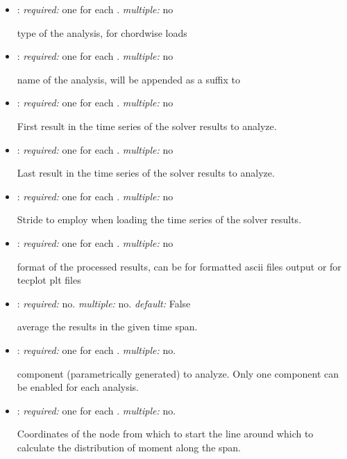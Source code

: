 \begin{itemize}
\item {}: \textit{required:} one for each . \textit{multiple:} no

type of the analysis,  for chordwise loads

\item {}: \textit{required:} one for each . \textit{multiple:} no

name of the analysis, will be appended as a suffix to 

\item {}: \textit{required:} one for each . 
\textit{multiple:} no

First result in the time series of the solver results to analyze.

\item {}: \textit{required:} one for each . 
\textit{multiple:} no

Last result in the time series of the solver results to analyze.

\item {}: \textit{required:} one for each . 
\textit{multiple:} no

Stride to employ when loading the time series of the solver results. 

\item {}: \textit{required:} one for each . 
\textit{multiple:} no

format of the processed results, can be  for formatted ascii files 
output or  for tecplot plt files

\item {}: \textit{required:} no. \textit{multiple:} no. 
\textit{default:} False

average the results in the given time span.

\item {}: \textit{required:} one for each . 
\textit{multiple:} no.

component (parametrically generated) to analyze. Only one component can be 
enabled for each analysis. 

\item {}: \textit{required:} one for each . 
\textit{multiple:} no.

Coordinates of the node from which to start the line around which to calculate 
the distribution of moment along the span.


\end{itemize}

